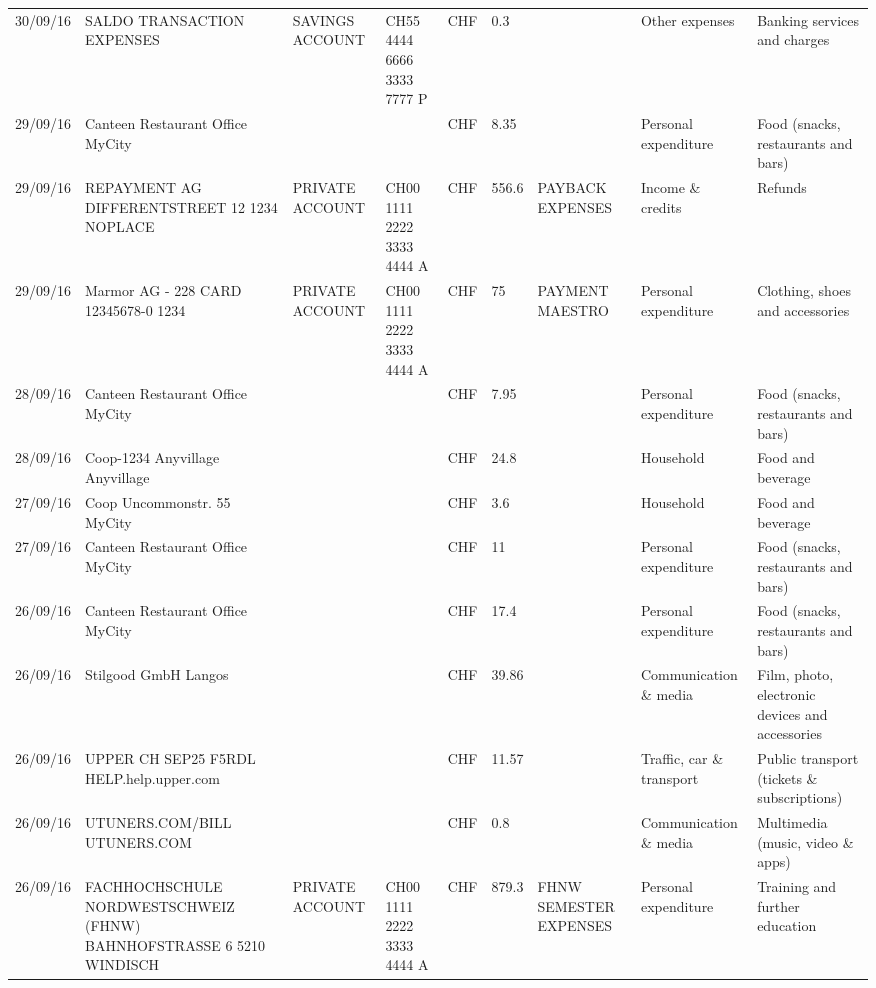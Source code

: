 \begin{landscape}
\begin{table}[t]
\begin{center}
\begin{tabular}{lllllllll}
		30/09/16 & SALDO TRANSACTION EXPENSES & SAVINGS ACCOUNT & CH55 4444 6666 3333 7777 P & CHF   & 0.3   &       & Other expenses & Banking services and charges \\
		29/09/16 & Canteen Restaurant Office      MyCity &       &       & CHF   & 8.35  &       & Personal expenditure & Food (snacks, restaurants and bars) \\
		29/09/16 & REPAYMENT AG DIFFERENTSTREET 12 1234 NOPLACE & PRIVATE ACCOUNT & CH00 1111 2222 3333 4444 A & CHF   & 556.6 & PAYBACK EXPENSES & Income \& credits & Refunds \\
		29/09/16 & Marmor AG - 228 CARD 12345678-0 1234 & PRIVATE ACCOUNT & CH00 1111 2222 3333 4444 A & CHF   & 75    & PAYMENT MAESTRO & Personal expenditure & Clothing, shoes and accessories \\
		28/09/16 & Canteen Restaurant Office      MyCity &       &       & CHF   & 7.95  &       & Personal expenditure & Food (snacks, restaurants and bars) \\
		28/09/16 & Coop-1234 Anyvillage    Anyvillage &       &       & CHF   & 24.8  &       & Household & Food and beverage \\
		27/09/16 & Coop Uncommonstr. 55   MyCity &       &       & CHF   & 3.6   &       & Household & Food and beverage \\
		27/09/16 & Canteen Restaurant Office      MyCity &       &       & CHF   & 11    &       & Personal expenditure & Food (snacks, restaurants and bars) \\
		26/09/16 & Canteen Restaurant Office      MyCity &       &       & CHF   & 17.4  &       & Personal expenditure & Food (snacks, restaurants and bars) \\
		26/09/16 & Stilgood GmbH             Langos &       &       & CHF   & 39.86 &       & Communication \& media & Film, photo, electronic devices and accessories \\
		26/09/16 & UPPER CH SEP25 F5RDL HELP.help.upper.com &       &       & CHF   & 11.57 &       & Traffic, car \& transport & Public transport (tickets \& subscriptions) \\
		26/09/16 & UTUNERS.COM/BILL          UTUNERS.COM &       &       & CHF   & 0.8   &       & Communication \& media & Multimedia (music, video \& apps) \\
		26/09/16 & FACHHOCHSCHULE NORDWESTSCHWEIZ (FHNW) BAHNHOFSTRASSE 6 5210 WINDISCH & PRIVATE ACCOUNT & CH00 1111 2222 3333 4444 A & CHF   & 879.3 & FHNW SEMESTER EXPENSES & Personal expenditure & Training and further education \\

\end{tabular}
\end{center}
\end{table}
\end{landscape}
